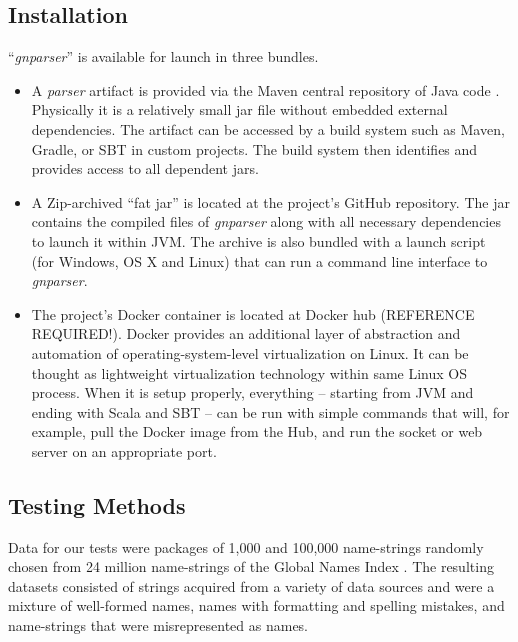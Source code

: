 \documentclass{bmcart}
\begin{document}
\subsection*{Installation}

``\textit{gnparser}'' is available for launch in three bundles.

\begin{itemize}
  \item A \textit{parser} artifact is provided via the Maven central repository of
    Java code \cite{maven-globalnames}. Physically it is a relatively small jar file without
    embedded external dependencies. The artifact can be accessed by a build system such
    as Maven, Gradle, or SBT in custom projects. The build system then
    identifies and provides access to all dependent jars.

  \item A Zip-archived ``fat jar'' is located at the project's GitHub
    repository. The jar contains the compiled files of \textit{gnparser} along
    with all necessary dependencies to launch it within JVM. The archive is
    also bundled with a launch script (for Windows, OS X and Linux) that can
    run a command line interface to \textit{gnparser}.

  \item The project's Docker container is located at Docker hub  (REFERENCE REQUIRED!).
    Docker provides an additional layer of abstraction and automation of
    operating-system-level virtualization on Linux. It can be thought as
    lightweight virtualization technology within same Linux OS process. When it
    is setup properly, everything -- starting from JVM and ending with Scala
    and SBT -- can be run with simple commands that will, for example,  pull
    the Docker image from the Hub, and run the socket or web server on an appropriate port.

\end{itemize}

\subsection*{Testing Methods}

Data for our tests were packages of 1,000 and 100,000 name-strings randomly chosen from
24 million name-strings of the Global Names Index \cite{gn:index}. The 
resulting datasets consisted of strings acquired from a variety of data sources
and were a mixture of well-formed names, names with formatting and spelling
mistakes, and name-strings that were misrepresented as names.
\end{document}
